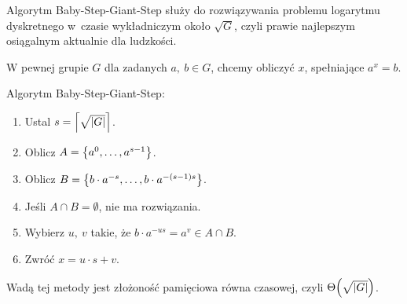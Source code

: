 Algorytm Baby-Step-Giant-Step służy do rozwiązywania problemu logarytmu dyskretnego w~czasie wykładniczym około \( \sqrt{G} \), czyli prawie najlepszym osiągalnym aktualnie dla ludzkości.

W pewnej grupie \( G \) dla zadanych \(a, \ b \in G \), chcemy obliczyć \( x \), spełniające \( a^x = b \).
\begin{greyframe}
    Algorytm Baby-Step-Giant-Step:
    \begin{enumerate}
    \item Ustal \( s = \left\lceil\sqrt{\left\lvert G\right\rvert}\right\rceil \).
    \item Oblicz \( A = \set{a^0, \dots, a^{s-1}} \).
    \item Oblicz \( B = \set{b \cdot a^{-s}, \dots,  b \cdot a^{-(s-1)s}} \).
    \item Jeśli \( A \cap B = \emptyset \), nie ma rozwiązania.
    \item Wybierz \( u, \ v \) takie, że \( b \cdot a^{-us} = a^v \in A \cap B \). \item Zwróć \( x = u \cdot s + v \).
    \end{enumerate}
\end{greyframe}

Wadą tej metody jest złożoność pamięciowa równa czasowej, czyli \( \Theta\pars{\sqrt{\abs{G}}} \).